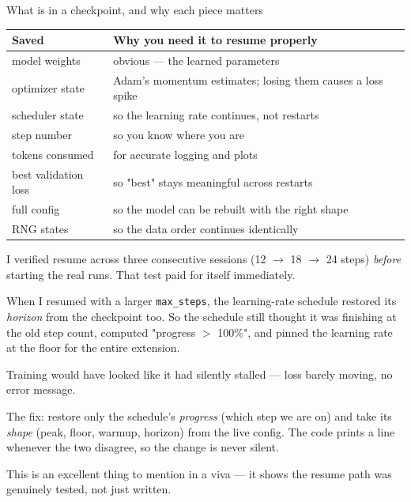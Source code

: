 \documentclass[11pt]{report}
\newcommand{\p}[1]{\texttt{#1}}
\begin{document}
\begin{implementation}{What is in a checkpoint, and why each piece matters}
\begin{center}
\begin{tabular}{ll}
\toprule
Saved & Why you need it to resume properly \\
\midrule
model weights & obvious --- the learned parameters \\
optimizer state & Adam's momentum estimates; losing them causes a loss spike \\
scheduler state & so the learning rate continues, not restarts \\
step number & so you know where you are \\
tokens consumed & for accurate logging and plots \\
best validation loss & so "best" stays meaningful across restarts \\
full config & so the model can be rebuilt with the right shape \\
RNG states & so the data order continues identically \\
\bottomrule
\end{tabular}
\end{center}

I verified resume across three consecutive sessions (12 $\to$ 18 $\to$ 24 steps)
\emph{before} starting the real runs. That test paid for itself immediately.
\end{implementation}

\begin{warnbox}
When I resumed with a larger \p{max\_steps}, the learning-rate schedule restored
its \emph{horizon} from the checkpoint too. So the schedule still thought it was
finishing at the old step count, computed "progress $>$ 100\%", and pinned the
learning rate at the floor for the entire extension.

Training would have looked like it had silently stalled --- loss barely moving,
no error message.

The fix: restore only the schedule's \emph{progress} (which step we are on) and
take its \emph{shape} (peak, floor, warmup, horizon) from the live config. The
code prints a line whenever the two disagree, so the change is never silent.

This is an excellent thing to mention in a viva --- it shows the resume path was
genuinely tested, not just written.
\end{warnbox}
\end{document}
